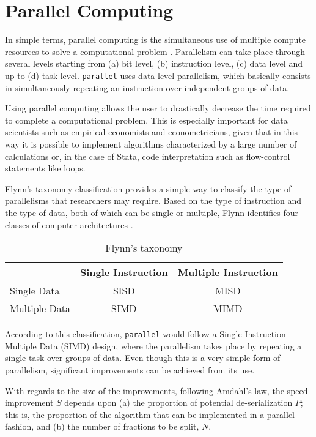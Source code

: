 \documentclass[letterpaper, 10pt]{article}
\begin{document}
\section{Parallel Computing}

In simple terms, parallel computing is the simultaneous use of multiple compute resources to solve a computational problem \cite{barney2012parallel}. Parallelism can take place through several levels starting from (a) bit level, (b) instruction level, (c) data level and up to (d) task level. {\tt parallel} uses data level parallelism, which basically consists in simultaneously repeating an instruction over independent groups of data.

Using parallel computing allows the user to drastically decrease the time required to complete a computational problem. This is especially important for data scientists such as empirical economists and econometricians, given that in this way it is possible to implement algorithms characterized by a large number of calculations or, in the case of Stata, code interpretation such as flow-control statements like loops.

Flynn's taxonomy classification  provides a simple way to classify the type of parallelisms that researchers may require. Based on the type of instruction and the type of data, both of which can be single or multiple, Flynn identifies four classes of computer architectures \cite{barney2012parallel}.

\begin{table}[h]
\centering
\caption{Flynn's taxonomy\label{tab:flyntaxonomy}}
\begin{tabular}{lcc}
\hline
& Single Instruction & Multiple Instruction \\ \hline
Single Data & SISD & MISD \\
Multiple Data & SIMD & MIMD \\ \hline
\end{tabular}
\end{table}

According to this classification, {\tt parallel} would follow a Single Instruction Multiple Data (SIMD) design, where the parallelism takes place by repeating a single task over groups of data. Even though this is a very simple form of parallelism, significant improvements can be achieved from its use.

With regards to the size of the improvements, following Amdahl's law, the speed improvement $S$ depends upon (a) the proportion of potential de-serialization $P$; this is, the proportion of the algorithm that can be implemented in a parallel fashion, and (b) the number of fractions to be split, $N$.
\end{document}
